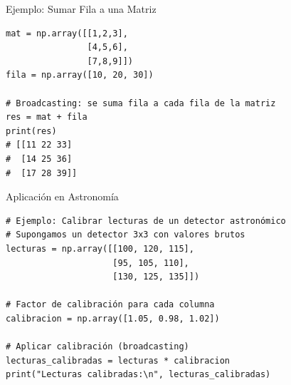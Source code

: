 \documentclass[10pt]{beamer}
\begin{document}
\begin{frame}[fragile]{Ejemplo: Sumar Fila a una Matriz}
\begin{verbatim}
mat = np.array([[1,2,3],
                [4,5,6],
                [7,8,9]])
fila = np.array([10, 20, 30])

# Broadcasting: se suma fila a cada fila de la matriz
res = mat + fila
print(res)
# [[11 22 33]
#  [14 25 36]
#  [17 28 39]]
\end{verbatim}
\begin{block}{Aplicación en Astronomía}
\begin{verbatim}
# Ejemplo: Calibrar lecturas de un detector astronómico
# Supongamos un detector 3x3 con valores brutos
lecturas = np.array([[100, 120, 115],
                     [95, 105, 110],
                     [130, 125, 135]])
                     
# Factor de calibración para cada columna
calibracion = np.array([1.05, 0.98, 1.02])

# Aplicar calibración (broadcasting)
lecturas_calibradas = lecturas * calibracion
print("Lecturas calibradas:\n", lecturas_calibradas)
\end{verbatim}
\end{block}
\end{frame}
\end{document}
